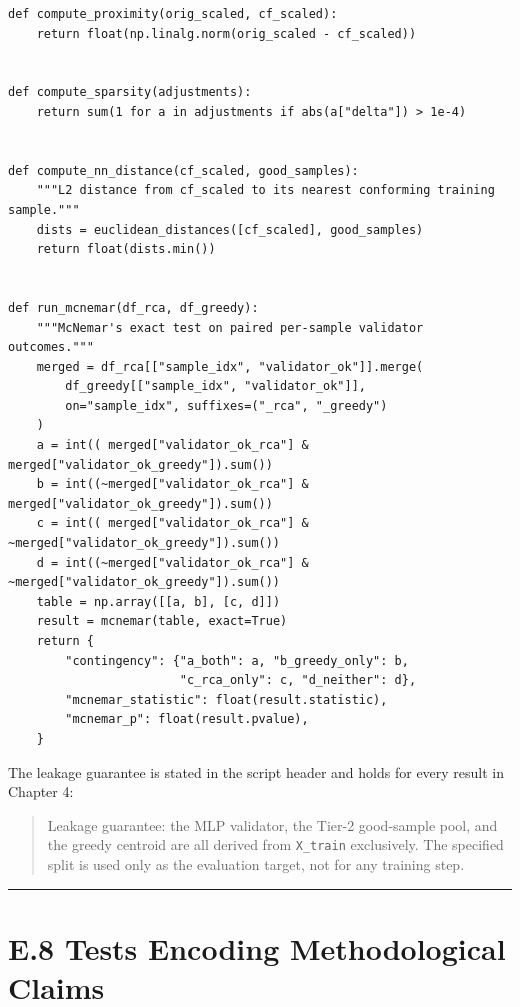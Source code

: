 \begin{verbatim}
def compute_proximity(orig_scaled, cf_scaled):
    return float(np.linalg.norm(orig_scaled - cf_scaled))


def compute_sparsity(adjustments):
    return sum(1 for a in adjustments if abs(a["delta"]) > 1e-4)


def compute_nn_distance(cf_scaled, good_samples):
    """L2 distance from cf_scaled to its nearest conforming training sample."""
    dists = euclidean_distances([cf_scaled], good_samples)
    return float(dists.min())


def run_mcnemar(df_rca, df_greedy):
    """McNemar's exact test on paired per-sample validator outcomes."""
    merged = df_rca[["sample_idx", "validator_ok"]].merge(
        df_greedy[["sample_idx", "validator_ok"]],
        on="sample_idx", suffixes=("_rca", "_greedy")
    )
    a = int(( merged["validator_ok_rca"] &  merged["validator_ok_greedy"]).sum())
    b = int((~merged["validator_ok_rca"] &  merged["validator_ok_greedy"]).sum())
    c = int(( merged["validator_ok_rca"] & ~merged["validator_ok_greedy"]).sum())
    d = int((~merged["validator_ok_rca"] & ~merged["validator_ok_greedy"]).sum())
    table = np.array([[a, b], [c, d]])
    result = mcnemar(table, exact=True)
    return {
        "contingency": {"a_both": a, "b_greedy_only": b,
                        "c_rca_only": c, "d_neither": d},
        "mcnemar_statistic": float(result.statistic),
        "mcnemar_p": float(result.pvalue),
    }
\end{verbatim}

The leakage guarantee is stated in the script header and holds for every result in Chapter 4:

\begin{quote}
Leakage guarantee: the MLP validator, the Tier-2 good-sample pool, and the greedy centroid are all derived from \texttt{X\_train} exclusively. The specified split is used only as the evaluation target, not for any training step.
\end{quote}

\begin{center}\rule{0.5\linewidth}{0.5pt}\end{center}

\hypertarget{e.8-tests-encoding-methodological-claims}{%
\section{E.8 Tests Encoding Methodological Claims}\label{e.8-tests-encoding-methodological-claims}}

